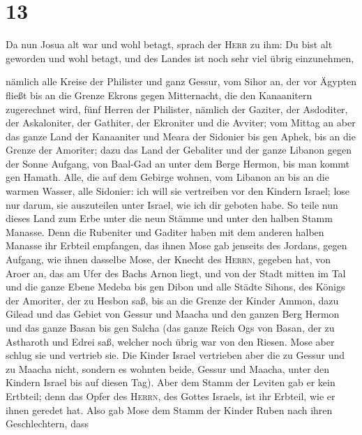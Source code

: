 \hypertarget{section-12}{%
\section{13}\label{section-12}}

 Da nun Josua alt war und wohl betagt, sprach der
\textsc{Herr} zu ihm: Du bist alt geworden und wohl betagt, und des
Landes ist noch sehr viel übrig einzunehmen,

 nämlich alle Kreise der Philister und ganz Gessur,
 vom Sihor an, der vor Ägypten fließt bis an die Grenze
Ekrons gegen Mitternacht, die den Kanaanitern zugerechnet wird, fünf
Herren der Philister, nämlich der Gaziter, der Asdoditer, der
Askaloniter, der Gathiter, der Ekroniter und die Avviter; 
vom Mittag an aber das ganze Land der Kanaaniter und Meara der Sidonier
bis gen Aphek, bis an die Grenze der Amoriter;  dazu das
Land der Gebaliter und der ganze Libanon gegen der Sonne Aufgang, von
Baal-Gad an unter dem Berge Hermon, bis man kommt gen Hamath.
 Alle, die auf dem Gebirge wohnen, vom Libanon an bis an
die warmen Wasser, alle Sidonier: ich will sie vertreiben vor den
Kindern Israel; lose nur darum, sie auszuteilen unter Israel, wie ich
dir geboten habe.  So teile nun dieses Land zum Erbe unter
die neun Stämme und unter den halben Stamm Manasse.  Denn
die Rubeniter und Gaditer haben mit dem anderen halben Manasse ihr
Erbteil empfangen, das ihnen Mose gab jenseits des Jordans, gegen
Aufgang, wie ihnen dasselbe Mose, der Knecht des \textsc{Herrn}, gegeben
hat,  von Aroer an, das am Ufer des Bachs Arnon liegt, und
von der Stadt mitten im Tal und die ganze Ebene Medeba bis gen Dibon
 und alle Städte Sihons, des Königs der Amoriter, der zu
Hesbon saß, bis an die Grenze der Kinder Ammon,  dazu
Gilead und das Gebiet von Gessur und Maacha und den ganzen Berg Hermon
und das ganze Basan bis gen Salcha  (das ganze Reich Ogs
von Basan, der zu Astharoth und Edrei saß, welcher noch übrig war von
den Riesen. Mose aber schlug sie und vertrieb sie.  Die
Kinder Israel vertrieben aber die zu Gessur und zu Maacha nicht, sondern
es wohnten beide, Gessur und Maacha, unter den Kindern Israel bis auf
diesen Tag).  Aber dem Stamm der Leviten gab er kein
Ertbteil; denn das Opfer des \textsc{Herrn}, des Gottes Israels, ist ihr
Erbteil, wie er ihnen geredet hat.  Also gab Mose dem
Stamm der Kinder Ruben nach ihren Geschlechtern,  dass

